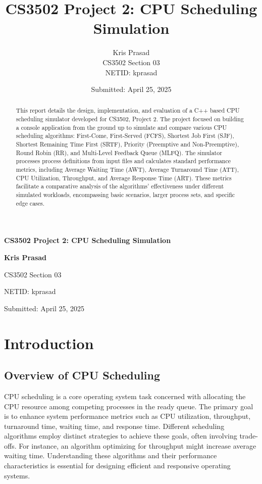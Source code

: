 \documentclass[12pt]{article}
\title{CS3502 Project 2: CPU Scheduling Simulation}
\author{Kris Prasad \\[0.5em]
CS3502 Section 03 \\[0.5em]
NETID: kprasad\\[0.5em]
}
\date{Submitted: April 25, 2025}
\begin{document}
\begin{titlepage}
    \centering
    \vspace*{2cm}
    
    {\LARGE\bfseries CS3502 Project 2: CPU Scheduling Simulation\par}
    \vspace{2cm}
    
    {\large\bfseries Kris Prasad\par}
    \vspace{0.5cm}
    {\large CS3502 Section 03\par}
    \vspace{0.5cm}
    {\large NETID: kprasad\par}
    \vspace{2cm}
    
    {\large Submitted: April 25, 2025\par}
    
    \vfill
    
\end{titlepage}

\newpage

\begin{abstract}
This report details the design, implementation, and evaluation of a C++ based CPU scheduling simulator developed for CS3502, Project 2. The project focused on building a console application from the ground up to simulate and compare various CPU scheduling algorithms: First-Come, First-Served (FCFS), Shortest Job First (SJF), Shortest Remaining Time First (SRTF), Priority (Preemptive and Non-Preemptive), Round Robin (RR), and Multi-Level Feedback Queue (MLFQ). The simulator processes process definitions from input files and calculates standard performance metrics, including Average Waiting Time (AWT), Average Turnaround Time (ATT), CPU Utilization, Throughput, and Average Response Time (ART). These metrics facilitate a comparative analysis of the algorithms' effectiveness under different simulated workloads, encompassing basic scenarios, larger process sets, and specific edge cases.
\end{abstract}

\newpage
\tableofcontents
\newpage

\section{Introduction}
\subsection{Overview of CPU Scheduling}
CPU scheduling is a core operating system task concerned with allocating the CPU resource among competing processes in the ready queue. The primary goal is to enhance system performance metrics such as CPU utilization, throughput, turnaround time, waiting time, and response time. Different scheduling algorithms employ distinct strategies to achieve these goals, often involving trade-offs. For instance, an algorithm optimizing for throughput might increase average waiting time. Understanding these algorithms and their performance characteristics is essential for designing efficient and responsive operating systems.
\end{document}
